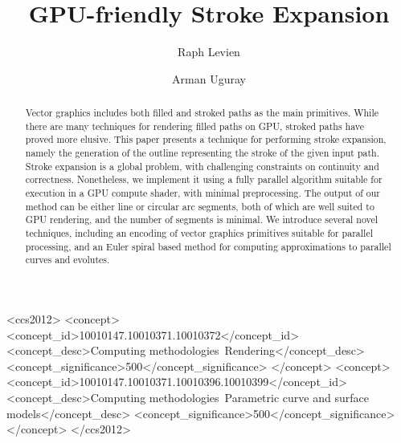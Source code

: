 \documentclass[sigconf, nonacm]{acmart}
\begin{document}
\title{GPU-friendly Stroke Expansion}
\author{Raph Levien}
\author{Arman Uguray}
\begin{CCSXML}
    <ccs2012>
       <concept>
           <concept_id>10010147.10010371.10010372</concept_id>
           <concept_desc>Computing methodologies~Rendering</concept_desc>
           <concept_significance>500</concept_significance>
           </concept>
       <concept>
           <concept_id>10010147.10010371.10010396.10010399</concept_id>
           <concept_desc>Computing methodologies~Parametric curve and surface models</concept_desc>
           <concept_significance>500</concept_significance>
           </concept>
     </ccs2012>
\end{CCSXML}




\begin{abstract}
    Vector graphics includes both filled and stroked paths as the main primitives. While there are many techniques for rendering filled paths on GPU, stroked paths have proved more elusive. This paper presents a technique for performing stroke expansion, namely the generation of the outline representing the stroke of the given input path. Stroke expansion is a global problem, with challenging constraints on continuity and correctness. Nonetheless, we implement it using a fully parallel algorithm suitable for execution in a GPU compute shader, with minimal preprocessing. The output of our method can be either line or circular arc segments, both of which are well suited to GPU rendering, and the number of segments is minimal. We introduce several novel techniques, including an encoding of vector graphics primitives suitable for parallel processing, and an Euler spiral based method for computing approximations to parallel curves and evolutes.
\end{abstract}


\maketitle
\thispagestyle{empty}
\pagestyle{plain}
\end{document}
